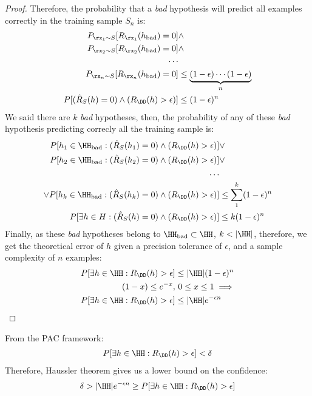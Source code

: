 \begin{proof}
	Therefore, the probability that a \emph{bad} hypothesis will predict all examples correctly in the training sample \(S_n\) is:
	\begin{align}
		P_{\rx_1 \sim S}[R_{\rx_1}(h_{\text{bad}})=0] &\land\\
		P_{\rx_2 \sim S}[R_{\rx_2}(h_{\text{bad}})=0] &\land\\
		\nonumber \cdots\\
		P_{\rx_n \sim S}[R_{\rx_n}(h_{\text{bad}})=0] &\leq \underbrace{(1-\epsilon) \cdots (1-\epsilon)}_{n} \\
		P[(\hat{R}_{S}(h)=0) \land (R_{\DD}(h)> \epsilon)] &\leq (1-\epsilon)^n
	\label{haussler:b} \end{align}
	We said there are \(k\) \emph{bad} hypotheses, then, the probability of any of these \emph{bad} hypothesis predicting correcly all the training sample is:
	\begin{align}
		P[h_1 \in \HH_{\text{bad}}: (\hat{R}_{S}(h_1)=0) \land (R_{\DD}(h)> \epsilon)] &\lor \\
		P[h_2 \in \HH_{\text{bad}}: (\hat{R}_{S}(h_2)=0) \land (R_{\DD}(h)> \epsilon)] &\lor \\
		\ldots \nonumber \\
		\lor P[h_k \in \HH_{\text{bad}}: (\hat{R}_{S}(h_k)=0) \land (R_{\DD}(h)> \epsilon)] &
		\leq \sum_{1}^k (1-\epsilon)^n\\
		P[\exists h \in H: (\hat{R}_{S}(h)=0) \land (R_{\DD}(h)>\epsilon)] &\leq k (1-\epsilon)^n
	\label{haussler:c} \end{align}
	Finally, as these \emph{bad} hypotheses belong to \(\HH_{\text{bad}} \subset \HH\), \(k < |\HH|\), therefore, we get the theoretical error of \(h\) given a precision tolerance of \(\epsilon\), and a sample complexity of \(n\) examples:
	\begin{align}
		P[\exists h \in \HH: R_{\DD}(h)>\epsilon]&\leq |\HH| (1-\epsilon)^n\label{haussler:d}\\
		(1-x) \leq e^{-x},&~0 \leq x \leq 1 \implies \nonumber\\
		P[\exists h \in \HH: R_{\DD}(h)>\epsilon]&\leq |\HH|e^{-\epsilon n}\label{haussler:e} \qedhere
	\end{align}
\end{proof}
From the PAC framework:
\begin{align}
	P[\exists h \in \HH: R_{\DD}(h)>\epsilon] < \delta
\end{align}
Therefore, Haussler theorem gives us a lower bound on the confidence:
\begin{align}
	\delta > |\HH|e^{-\epsilon n} \geq P[\exists h \in \HH: R_{\DD}(h)>\epsilon]\label{eq:delta}
\end{align}

